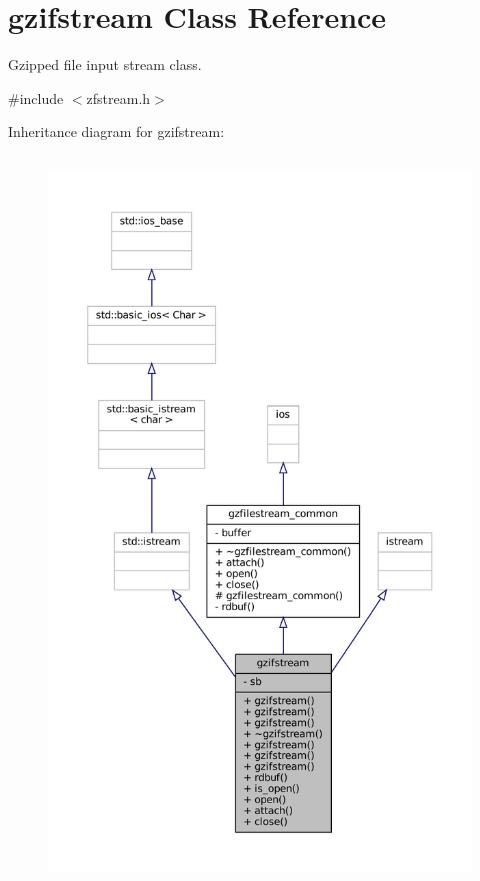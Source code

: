 \hypertarget{classgzifstream}{}\section{gzifstream Class Reference}
\label{classgzifstream}


Gzipped file input stream class.  




{\ttfamily \#include $<$zfstream.\+h$>$}



Inheritance diagram for gzifstream\+:
\nopagebreak
\begin{figure}[H]
\begin{center}
\leavevmode
\includegraphics[height=550pt]{classgzifstream__inherit__graph}
\end{center}
\end{figure}


